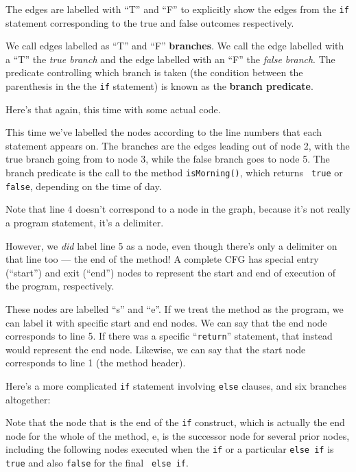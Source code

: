 The edges are labelled with ``T'' and ``F'' to explicitly show the edges from
the {\tt if} statement corresponding to the true and false outcomes
respectively.

We call edges labelled as ``T'' and ``F'' {\bf branches}. We call the edge
labelled with a ``T'' the {\it true branch} and the edge labelled with an ``F''
the {\it false branch}. The predicate controlling which branch is taken (the
condition between the parenthesis in the the {\tt if} statement) is known as the
{\bf branch predicate}.


Here's that again, this time with some actual code. 


This time we've labelled the nodes according to the line numbers that each
statement appears on. The branches are the edges leading out of node 2, with the
true branch going from to node 3, while the false branch goes to node 5. The
branch predicate is the call to the method {\tt isMorning()}, which returns {\tt
true} or {\tt false}, depending on the time of day.

Note that line 4 doesn't correspond to a node in the graph, because it's not
really a program statement, it's a delimiter.

However, we {\it did} label line 5 as a node, even though there's only a
delimiter on that line too --- the end of the method! A complete CFG has special
entry (``start'') and exit (``end'') nodes to represent the start and end of
execution of the program, respectively. 


These nodes are labelled ``s'' and ``e''. If we treat the method as the program,
we can label it with specific start and end nodes. We can say that the end node
corresponds to line 5. If there was a specific ``{\tt return}'' statement, that
instead would represent the end node. Likewise, we can say that the start node
corresponds to line 1 (the method header).


Here's a more complicated {\tt if} statement involving {\tt else} clauses, and
six branches altogether:


Note that the node that is the end of the {\tt if} construct, which is actually
the end node for the whole of the method, e, is the successor node for several
prior nodes, including the following nodes executed when the {\tt if} or a
particular {\tt else if} is {\tt true} and also {\tt false} for the final {\tt
else if}.



